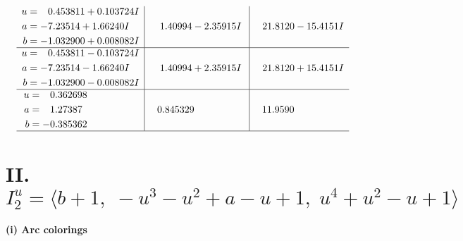 \documentclass[1p]{elsarticle_modified}
\theoremstyle{definition}
\begin{document}
$$\begin{array}{c|c|c}
\begin{aligned}
u &= \phantom{-}0.453811 + 0.103724 I \\
a &= -7.23514 + 1.66240 I \\
b &= -1.032900 + 0.008082 I\end{aligned}
 & \phantom{-}1.40994 - 2.35915 I & \phantom{-}21.8120 - 15.4151 I \\ \hline\begin{aligned}
u &= \phantom{-}0.453811 - 0.103724 I \\
a &= -7.23514 - 1.66240 I \\
b &= -1.032900 - 0.008082 I\end{aligned}
 & \phantom{-}1.40994 + 2.35915 I & \phantom{-}21.8120 + 15.4151 I \\ \hline\begin{aligned}
u &= \phantom{-}0.362698\phantom{ +0.000000I} \\
a &= \phantom{-}1.27387\phantom{ +0.000000I} \\
b &= -0.385362\phantom{ +0.000000I}\end{aligned}
 & \phantom{-}0.845329\phantom{ +0.000000I} & \phantom{-}11.9590\phantom{ +0.000000I}\\
 \hline 
 \end{array}$$\newpage\newpage\renewcommand{\arraystretch}{1}
\centering \section*{II. $I^u_{2}= \langle b+1,\;- u^3- u^2+a- u+1,\;u^4+u^2- u+1 \rangle$}
\flushleft \textbf{(i) Arc colorings}\\
\end{document}
